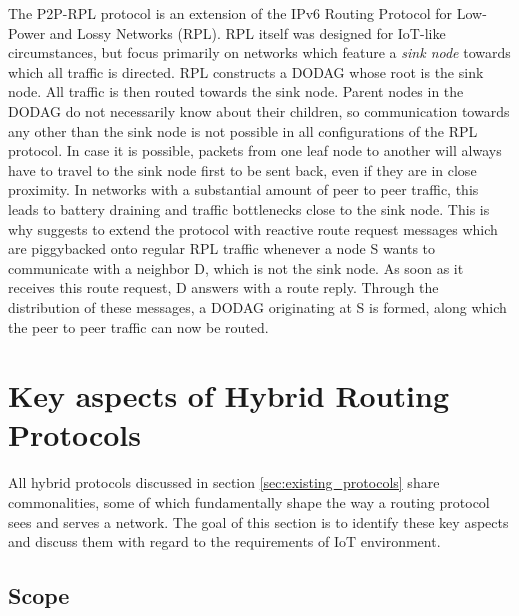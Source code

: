 \documentclass[a4paper,10pt]{scrartcl}
\begin{document}
The P2P-RPL protocol is an extension of the IPv6 Routing Protocol for Low-Power and Lossy Networks (RPL)\cite{RPL}. RPL itself was designed for IoT-like circumstances, but focus primarily on networks which feature a \emph{sink node} towards which all traffic is directed. RPL constructs a \gls{DODAG} whose root is the sink node. All traffic is then routed towards the sink node. Parent nodes in the DODAG do not necessarily know about their children, so communication towards any other than the sink node is not possible in all configurations of the RPL protocol. In case it is possible, packets from one leaf node to another will always have to travel to the sink node first to be sent back, even if they are in close proximity. In networks with a substantial amount of peer to peer traffic, this leads to battery draining and traffic bottlenecks close to the sink node. This is why \cite{baccelli_p2p_rpl} suggests to extend the protocol with reactive route request messages which are piggybacked onto regular RPL traffic whenever a node S wants to communicate with a neighbor D, which is not the sink node. As soon as it receives this route request, D answers with a route reply. Through the distribution of these messages, a DODAG originating at S is formed, along which the peer to peer traffic can now be routed.


\section{Key aspects of Hybrid Routing Protocols}
\label{sec:key_aspects}
All hybrid protocols discussed in section \ref{sec:existing_protocols} share commonalities, some of which fundamentally shape the way a routing protocol sees and serves a network. The goal of this section is to identify these key aspects and discuss them with regard to the requirements of IoT environment.

\subsection{Scope}
\label{subsec:scope}
\end{document}
